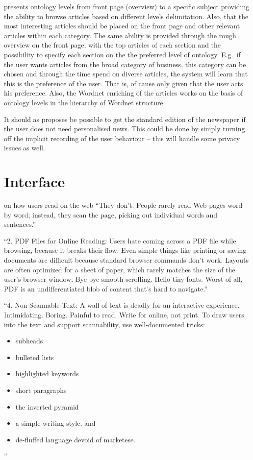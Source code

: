 \cite{21172_ftp.pdf} presents ontology levels from front page (overview) to a specific subject providing the ability to browse articles based on different levels delimitation. Also, that the most interesting articles should be placed on the front page and other relevant articles within each category. The same ability is provided through the rough overview on the front page, with the top articles of each section and the possibility to specify each section on the the preferred level of ontology. E.g.\ if the user wants articles from the broad category of business, this category can be chosen and through the time spend on diverse articles, the system will learn that this is the preference of the user. That is, of cause only given that the user acts his preference. Also, the Wordnet enriching of the articles works on the basis of ontology levels in the hierarchy of Wordnet structure.

It should as \cite{21172_ftp.pdf} proposes be possible to get the standard edition of the newspaper if the user does not need personalised news. This could be done by simply turning off the implicit recording of the user behaviour -- this will handle some privacy issues as well.

\section{Interface}
\cite{NielsenWeb} on how users read on the web ``They don't. People rarely read Web pages word by word; instead, they scan the page, picking out individual words and sentences.''

``2. PDF Files for Online Reading:
Users hate coming across a PDF file while browsing, because it breaks their flow. Even simple things like printing or saving documents are difficult because standard browser commands don't work. Layouts are often optimized for a sheet of paper, which rarely matches the size of the user's browser window. Bye-bye smooth scrolling. Hello tiny fonts.
Worst of all, PDF is an undifferentiated blob of content that's hard to navigate.''

``4. Non-Scannable Text:
A wall of text is deadly for an interactive experience. Intimidating. Boring. Painful to read.
Write for online, not print. To draw users into the text and support scannability, use well-documented tricks:
\begin{itemize}
	\item subheads
	\item bulleted lists
	\item highlighted keywords
	\item short paragraphs
	\item the inverted pyramid
	\item a simple writing style, and
	\item de-fluffed language devoid of marketese.
\end{itemize}
''

